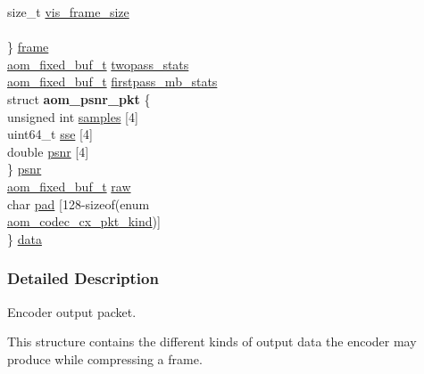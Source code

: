 \begin{DoxyCompactItemize}
\begin{tabbing}
\>\>size\_t \hyperlink{structaom__codec__cx__pkt_a9219d4191e4141bd806ab5b55fb93f9d}{vis\_frame\_size}\\
\>\>\\
\>\} \hyperlink{structaom__codec__cx__pkt_a4180a6ae59b0d295bc915d4689df4cb0}{frame}\\
\>\hyperlink{group__encoder_ga85cca9fad6bc25c667f013a39c607174}{aom\_fixed\_buf\_t} \hyperlink{structaom__codec__cx__pkt_a40d469839bcd8195c3c8e80db6561dbb}{twopass\_stats}\\
\>\hyperlink{group__encoder_ga85cca9fad6bc25c667f013a39c607174}{aom\_fixed\_buf\_t} \hyperlink{structaom__codec__cx__pkt_a8ce39bab39da5a247a27e42eb78386e2}{firstpass\_mb\_stats}\\
\>struct {\bfseries aom\_psnr\_pkt} \{\\
\>\>unsigned int \hyperlink{structaom__codec__cx__pkt_ae506ecf56b35d126ac24eb2c3ba7bb07}{samples} \mbox{[}4\mbox{]}\\
\>\>uint64\_t \hyperlink{structaom__codec__cx__pkt_afe2d06d74e3fae7d04fdde4e7d1ae455}{sse} \mbox{[}4\mbox{]}\\
\>\>double \hyperlink{structaom__codec__cx__pkt_a3a38e942aa0da463260a05eb05f51762}{psnr} \mbox{[}4\mbox{]}\\
\>\} \hyperlink{structaom__codec__cx__pkt_a95d437114a001414f864e086ca6ab152}{psnr}\\
\>\hyperlink{group__encoder_ga85cca9fad6bc25c667f013a39c607174}{aom\_fixed\_buf\_t} \hyperlink{structaom__codec__cx__pkt_a4fc6ea5e240c5df0acbf77aa2fe5ec6f}{raw}\\
\>char \hyperlink{structaom__codec__cx__pkt_afe326262723aeb6bcd2eaa32d8d83336}{pad} \mbox{[}128-\/sizeof(enum \\
\>\>\hyperlink{group__encoder_gafeb69da4a9649a54e805f59c26d8dfed}{aom\_codec\_cx\_pkt\_kind})\mbox{]}\\
\} \hyperlink{structaom__codec__cx__pkt_afb379cd4bfa7692d1d6e85f4e4b2b410}{data}\\

\end{tabbing}\end{DoxyCompactItemize}


\subsubsection{Detailed Description}
Encoder output packet. 

This structure contains the different kinds of output data the encoder may produce while compressing a frame. 


